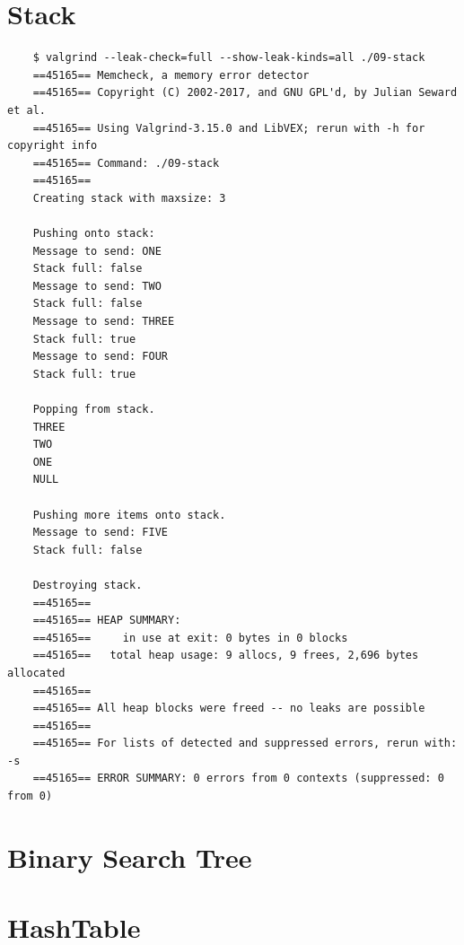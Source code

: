 \documentclass[../main.tex]{subfiles}
\begin{document}
	\section{Stack}
	
	
	
	
	
	\begin{verbatim}
	$ valgrind --leak-check=full --show-leak-kinds=all ./09-stack
	==45165== Memcheck, a memory error detector
	==45165== Copyright (C) 2002-2017, and GNU GPL'd, by Julian Seward et al.
	==45165== Using Valgrind-3.15.0 and LibVEX; rerun with -h for copyright info
	==45165== Command: ./09-stack
	==45165== 
	Creating stack with maxsize: 3
	
	Pushing onto stack:
	Message to send: ONE
	Stack full: false
	Message to send: TWO
	Stack full: false
	Message to send: THREE
	Stack full: true
	Message to send: FOUR
	Stack full: true
	
	Popping from stack.
	THREE
	TWO
	ONE
	NULL
	
	Pushing more items onto stack.
	Message to send: FIVE
	Stack full: false
	
	Destroying stack.
	==45165== 
	==45165== HEAP SUMMARY:
	==45165==     in use at exit: 0 bytes in 0 blocks
	==45165==   total heap usage: 9 allocs, 9 frees, 2,696 bytes allocated
	==45165== 
	==45165== All heap blocks were freed -- no leaks are possible
	==45165== 
	==45165== For lists of detected and suppressed errors, rerun with: -s
	==45165== ERROR SUMMARY: 0 errors from 0 contexts (suppressed: 0 from 0)
	\end{verbatim}
	\section{Binary Search Tree}
	
	\section{HashTable}
	
\end{document}
